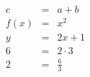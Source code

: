 \begin{eqnarray*}
   c &=& a + b \\
f(x) &=& x^2 \\
   y &=& 2x + 1 \\
   6 &=& 2 \cdot 3 \\
   2 &=& \frac{6}{3} \\
\end{eqnarray*}
